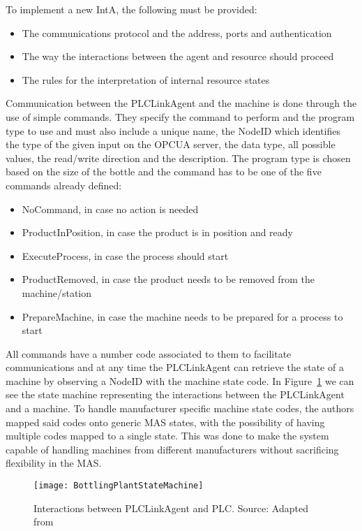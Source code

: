 To implement a new \gls{IntA}, the following must be provided:
\begin{itemize}
	\item The communications protocol and the address, ports and authentication
	\item The way the interactions between the agent and resource should proceed
	\item The rules for the interpretation of internal resource states
\end{itemize}

Communication between the PLCLinkAgent and the machine is done through the use of simple commands. They specify the command to perform and the program type to use and must also include a unique name, the NodeID which identifies the type of the given input on the \gls{OPCUA} server, the data type, all possible values, the read/write direction and the description. The program type is chosen based on the size of the bottle and the command has to be one of the five commands already defined:

\begin{itemize}
	\item NoCommand, in case no action is needed
	\item ProductInPosition, in case the product is in position and ready
	\item ExecuteProcess, in case the process should start
	\item ProductRemoved, in case the product needs to be removed from the machine/station
	\item PrepareMachine, in case the machine needs to be prepared for a process to start
\end{itemize}

All commands have a number code associated to them to facilitate communications and at any time the PLCLinkAgent can retrieve the state of a machine by observing a NodeID with the machine state code. In Figure~\ref{fig:bottling_plant_state_achine} we can see the state machine representing the interactions between the PLCLinkAgent and a machine. To handle manufacturer specific machine state codes, the authors mapped said codes onto generic \gls{MAS} states, with the possibility of having multiple codes mapped to a single state. This was done to make the system capable of handling machines from different manufacturers without sacrificing flexibility in the \gls{MAS}.

\begin{figure}[h!]
	\centering
	\texttt{[image: BottlingPlantStateMachine]}
	\caption{Interactions between PLCLinkAgent and \gls{PLC}. Source: Adapted from \cite{bottling_plant_part2}}
	\label{fig:bottling_plant_state_achine}
\end{figure}

